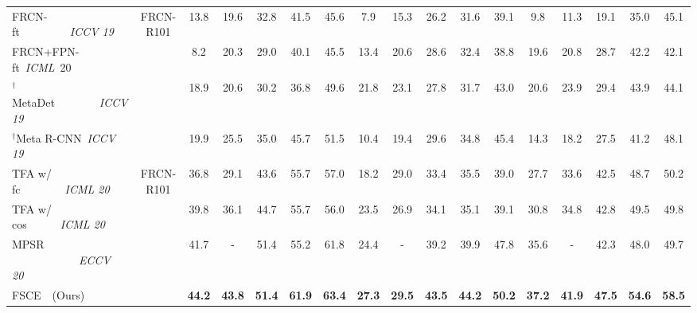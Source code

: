 \documentclass[final]{cvpr}
\begin{document}
\begin{table*}[htbp]
\begin{center}
{\begin{tabular}{l|c|ccccc|ccccc|ccccc}
\midrule
FRCN-ft~~~~~~~~~\textit{ICCV 19} \cite{wang_meta-learning_2019} & \multirow{4}{*}{FRCN-R101} & 13.8 &  19.6 &  32.8 &  41.5 &  45.6 &  7.9 &  15.3 &  26.2 &  31.6 &  39.1 &  9.8 &  11.3 &  19.1 &  35.0 &  45.1\\
FRCN+FPN-ft~\textit{ICML}~20\cite{wang_frustratingly_2020} &&  8.2 &  20.3 &  29.0 &  40.1 &  45.5 &  13.4 &  20.6 &  28.6 &  32.4 &  38.8 &  19.6  & 20.8 &  28.7 &  42.2  & 42.1\\
$^\dagger$MetaDet~~~~~~~~\textit{ICCV 19}~\cite{wang_meta-learning_2019} &  &  18.9 &  20.6 &  30.2 &  36.8 &  49.6 &  21.8 &  23.1 &  27.8 &  31.7 &  43.0 &  20.6 &  23.9 &  29.4 &  43.9 &  44.1\\
$^\dagger$Meta R-CNN~\textit{ICCV 19}~\cite{yan_meta_2020} &  & 19.9 &  25.5 &  35.0 &  45.7 &  51.5 &  10.4  & 19.4 &  29.6 &  34.8  & 45.4  & 14.3  & 18.2  & 27.5 &  41.2 &  48.1\\
\midrule
TFA w/ fc~~~~~~~~\textit{ICML 20}~\cite{wang_frustratingly_2020} & \multirow{4}{*}{FRCN-R101} & 36.8 &  29.1 &  43.6 &  55.7 &  57.0 &  18.2 &  29.0 &  33.4 &  35.5 &  39.0 &  27.7 &  33.6 &  42.5 &  48.7 &  50.2\\
TFA w/ cos~~~~~~\textit{ICML 20} \cite{wang_frustratingly_2020} &  & 39.8 &  36.1 &  44.7 &  55.7 &  56.0 &  23.5 &  26.9 &  34.1 &  35.1 &  39.1 &  30.8 &  34.8 &  42.8 &  49.5 &  49.8\\
MPSR ~~~~~~~~~~~~\textit{ECCV 20}~\cite{wu_multi-scale_2020} & & 41.7 & - & 51.4 & 55.2 & 61.8 & 24.4 & - & 39.2 & 39.9 & 47.8 & 35.6 & - & 42.3 & 48.0 & 49.7\\
\rowcolor{mygray}
FSCE~~(Ours) & & \bf{44.2} & \bf{43.8} & \bf{51.4} & \bf{61.9} & \bf{63.4} & \bf{27.3} & \bf{29.5} & \bf{43.5} & \bf{44.2} & \bf{50.2} & \bf{37.2} & \bf{41.9} & \bf{47.5} & \bf{54.6} & \bf{58.5}\\


\end{tabular}}
\end{center}
\end{table*}
\end{document}
